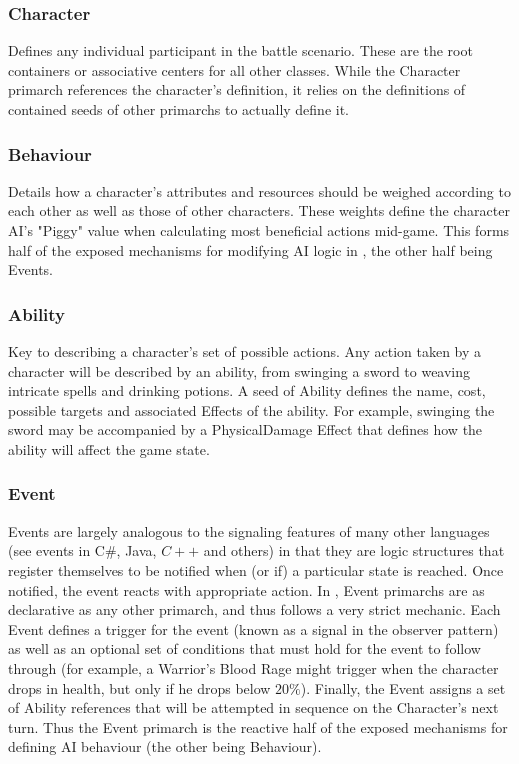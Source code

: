 \subsubsection{Character}
Defines any individual participant in the battle scenario. These are the root containers or associative centers for all other classes. While the Character primarch references the character's definition, it relies on the definitions of contained seeds of other primarchs to actually define it.

\subsubsection{Behaviour}
Details how a character's attributes and resources should be weighed according to each other as well as those of other characters. These weights define the character AI's "Piggy" value when calculating most beneficial actions mid-game. This forms half of the exposed mechanisms for modifying AI logic in \langname{}, the other half being Events. 

\subsubsection{Ability} 
Key to describing a character's set of possible actions. Any action taken by a character will be described by an ability, from swinging a sword to weaving intricate spells and drinking potions. A seed of Ability defines the name, cost, possible targets and associated Effects of the ability. For example, swinging the sword may be accompanied by a PhysicalDamage Effect that defines how the ability will affect the game state.

\subsubsection{Event}
Events are largely analogous to the signaling features of many other languages (see events in C\#, Java, $C++$ and others) in that they are logic structures that register themselves to be notified when (or if) a particular state is reached. Once notified, the event reacts with appropriate action. In \langname{}, Event primarchs are as declarative as any other primarch, and thus follows a very strict mechanic. Each Event defines a trigger for the event (known as a signal in the observer pattern) as well as an optional set of conditions that must hold for the event to follow through (for example, a Warrior's Blood Rage might trigger when the character drops in health, but only if he drops below $20\%$). Finally, the Event assigns a set of Ability references that will be attempted in sequence on the Character's next turn. Thus the Event primarch is the reactive half of the exposed mechanisms for defining AI behaviour (the other being Behaviour).


